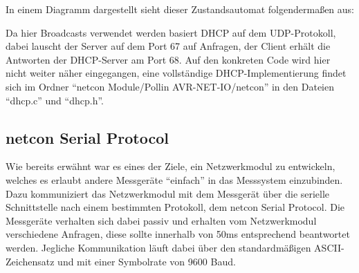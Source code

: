 \documentclass[a4paper,14pt,headsepline]{scrartcl}
\begin{document}
In einem Diagramm dargestellt sieht dieser Zustandsautomat folgendermaßen aus:
\begin{figure}[h]
\begin{center}
\end{center}
\end{figure}

Da hier Broadcasts verwendet werden basiert DHCP auf dem UDP-Protokoll, dabei lauscht der Server auf dem Port 67 auf Anfragen, der Client erhält die Antworten der DHCP-Server am Port 68. Auf den konkreten Code wird hier nicht weiter näher eingegangen, eine vollständige DHCP-Implementierung findet sich im Ordner "`netcon Module/Pollin AVR-NET-IO/netcon"' in den Dateien "`dhcp.c"' und "`dhcp.h"'.

\subsection{netcon Serial Protocol}
Wie bereits erwähnt war es eines der Ziele, ein Netzwerkmodul zu entwickeln, welches es erlaubt andere Messgeräte "`einfach"' in das Messsystem einzubinden. Dazu kommuniziert das Netzwerkmodul mit dem Messgerät über die serielle Schnittstelle nach einem bestimmten Protokoll, dem netcon Serial Protocol. Die Messgeräte verhalten sich dabei passiv und erhalten vom Netzwerkmodul verschiedene Anfragen, diese sollte innerhalb von 50ms entsprechend beantwortet werden. Jegliche Kommunikation läuft dabei über den standardmäßigen ASCII-Zeichensatz und mit einer Symbolrate von 9600 Baud.
\end{document}
